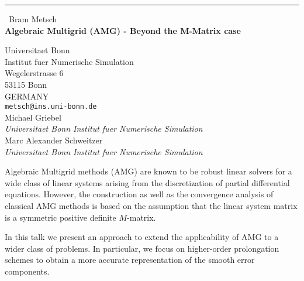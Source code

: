 \documentclass{report}
\begin{document}
\begin{center}
\rule{6in}{1pt} \
{\large Bram Metsch \\
{\bf Algebraic Multigrid (AMG) - Beyond the M-Matrix case}}

Universitaet Bonn \\ Institut fuer Numerische Simulation \\ Wegelerstrasse 6 \\ 53115 Bonn \\ GERMANY
\\
{\tt metsch@ins.uni-bonn.de}\\
Michael Griebel\\
{\em Universitaet Bonn
Institut fuer Numerische Simulation}\\
Marc Alexander Schweitzer\\
{\em Universitaet Bonn
Institut fuer Numerische Simulation}\end{center}

Algebraic Multigrid methods (AMG) are known to be robust linear
solvers for a wide class of linear systems arising from the
discretization of partial differential equations.
However, the construction as well as the convergence analysis of
classical AMG methods is based on the assumption that the linear system
matrix is a symmetric positive definite $M$-matrix.

In this talk we present an approach to extend the applicability of AMG to
a wider class of problems. In particular, we focus on higher-order
prolongation schemes to obtain a more accurate representation of the
smooth error components.
\end{document}
